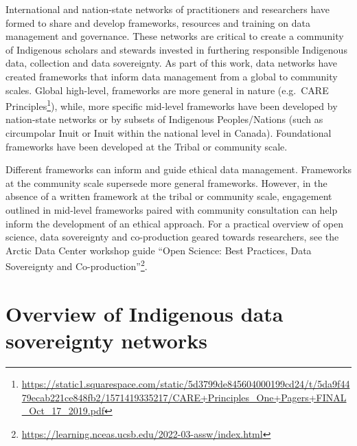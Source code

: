 \documentclass[
  11pt,
  paperpaper,
  openany]{book}
\DeclareRobustCommand{\href}[2]{#2\footnote{\url{#1}}}
\begin{document}
International and nation-state networks of practitioners and researchers have formed to share and develop frameworks, resources and training on data management and governance. These networks are critical to create a community of Indigenous scholars and stewards invested in furthering responsible Indigenous data, collection and data sovereignty. As part of this work, data networks have created frameworks that inform data management from a global to community scales. Global high-level, frameworks are more general in nature (e.g.~\href{https://static1.squarespace.com/static/5d3799de845604000199cd24/t/5da9f4479ecab221ce848fb2/1571419335217/CARE+Principles_One+Pagers+FINAL_Oct_17_2019.pdf}{CARE Principles}), while, more specific mid-level frameworks have been developed by nation-state networks or by subsets of Indigenous Peoples/Nations (such as circumpolar Inuit or Inuit within the national level in Canada). Foundational frameworks have been developed at the Tribal or community scale.

Different frameworks can inform and guide ethical data management. Frameworks at the community scale supersede more general frameworks. However, in the absence of a written framework at the tribal or community scale, engagement outlined in mid-level frameworks paired with community consultation can help inform the development of an ethical approach. For a practical overview of open science, data sovereignty and co-production geared towards researchers, see the Arctic Data Center workshop guide \href{https://learning.nceas.ucsb.edu/2022-03-assw/index.html}{``Open Science: Best Practices, Data Sovereignty and Co-production''}.

\hypertarget{overview-of-indigenous-data-sovereignty-networks}{%
\section*{Overview of Indigenous data sovereignty networks}\label{overview-of-indigenous-data-sovereignty-networks}}
\end{document}
